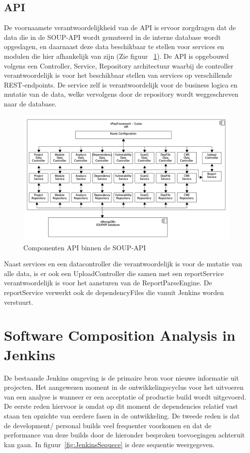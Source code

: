 \subsection{API}\label{subsec:api2}
De voornaamste verantwoordelijkheid van de API is ervoor zorgdragen dat de data die in de SOUP-API wordt gemuteerd in de interne database wordt opgeslagen, en daarnaast deze data beschikbaar te stellen voor services en modulen die hier afhankelijk van zijn (Zie figuur ~\ref{fig:SOUPAPI-API comps}). De API is opgebouwd volgens een Controller, Service, Repository architectuur waarbij de controller verantwoordelijk is voor het beschikbaar stellen van services op verschillende REST-endpoints. De service zelf is verantwoordelijk voor de business logica en mutatie van de data, welke vervolgens door de repository wordt weggeschreven naar de database.
\begin{figure}[bth]
    \myfloatalign
    \includegraphics[width=15cm]{gfx/umlet/exports/API-ComponentsDiagram}
    \caption{Componenten API binnen de SOUP-API}
    \label{fig:SOUPAPI-API comps}
\end{figure}

Naast services en een datacontroller die verantwoordelijk is voor de mutatie van alle data, is er ook een UploadController die samen met een reportService verantwoordelijk is voor het aansturen van de ReportParseEngine. De reportService verwerkt ook de dependencyFiles die vanuit Jenkins worden verstuurt.


\section{Software Composition Analysis in Jenkins}\label{sec:jenkins}
De bestaande Jenkins omgeving is de primaire bron voor nieuwe informatie uit projecten. Het aangewezen moment in de ontwikkelingscyclus voor het uitvoeren van een analyse is wanneer er een acceptatie of productie build wordt uitgevoerd. De eerste reden hiervoor is omdat op dit moment de dependencies relatief vast staan ten opzichte van eerdere fasen in de ontwikkeling. De tweede reden is dat de development/ personal builds veel frequenter voorkomen en dat de performance van deze builds door de hieronder besproken toevoegingen achteruit kan gaan. In figuur~\ref{fig:JenkinsSequece} is deze sequentie weergegeven.


